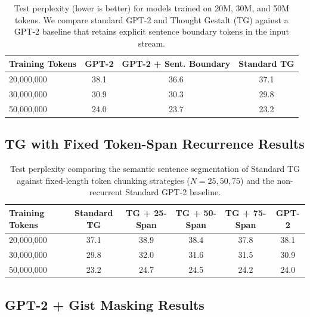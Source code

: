\documentclass{article}
\begin{document}
\begin{table}[H]
    \centering
    \caption{Test perplexity (lower is better) for models trained on 20M, 30M, and 50M tokens. We compare standard GPT-2 and Thought Gestalt (TG) against a GPT-2 baseline that retains explicit sentence boundary tokens in the input stream.}
    \label{tab:baseline_sentence_boundary}
    \vspace{0.2em}
    \begin{tabular}{lccc}
        \toprule
        \textbf{Training Tokens} & \textbf{GPT-2} & \textbf{GPT-2 + Sent. Boundary} & \textbf{Standard TG} \\
        \midrule
        20,000,000 & 38.1 & 36.6 & 37.1 \\
        30,000,000 & 30.9 & 30.3 & 29.8 \\
        50,000,000 & 24.0 & 23.7 & 23.2 \\
        \bottomrule
    \end{tabular}
\end{table}

\subsection{TG with Fixed Token-Span Recurrence Results}
\label{tab:fixed_span_tables}
\begin{table}[H]
    \centering
    \caption{Test perplexity comparing the semantic sentence segmentation of Standard TG against fixed-length token chunking strategies ($N=25, 50, 75$) and the non-recurrent Standard GPT-2 baseline.}
    \label{tab:baseline_token_span}
    \vspace{0.2em}
    \begin{tabular}{lccccc}
        \toprule
        \textbf{Training Tokens} & \textbf{Standard TG} & \textbf{TG + 25-Span} & \textbf{TG + 50-Span} & \textbf{TG + 75-Span} & \textbf{GPT-2} \\
        \midrule
        20,000,000 & 37.1 & 38.9 & 38.4 & 37.8 & 38.1 \\
        30,000,000 & 29.8 & 32.0 & 31.6 & 31.5 & 30.9 \\
        50,000,000 & 23.2 & 24.7 & 24.5 & 24.2 & 24.0 \\
        \bottomrule
    \end{tabular}
\end{table}



\subsection{GPT-2 + Gist Masking Results}
\label{tab:gisting_table}
\end{document}
